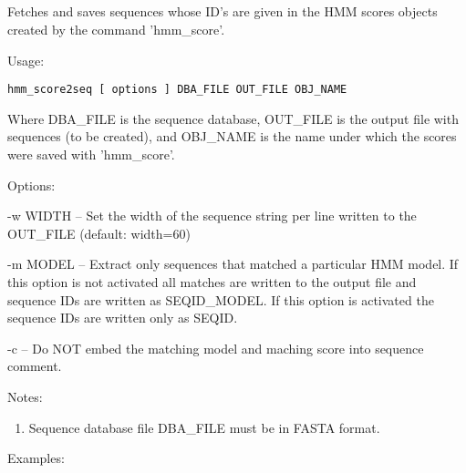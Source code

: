 

\subsection[hmm\_score2seq]{  }



Fetches and saves sequences whose ID's are given in the HMM scores
objects created by the command 'hmm\_score'.


\begin{description}


\item{Usage:}

{\tt hmm\_score2seq [ options ] DBA\_FILE OUT\_FILE OBJ\_NAME}

Where DBA\_FILE is the sequence database, OUT\_FILE is the output file
with sequences (to be created), and OBJ\_NAME is the name under which
the scores were saved with 'hmm\_score'.


\item{Options:}
\begin{description}
\item -w WIDTH -- Set the width of the sequence string per line written
to the OUT\_FILE (default: width=60)
\item -m MODEL -- Extract only sequences that matched a particular HMM
model. If this option is not activated all matches are written to
the output file and sequence IDs are written as SEQID\@PFAM\_MODEL.
If this option is activated the sequence IDs are written only as
SEQID.
\item -c -- Do NOT embed the matching model and maching score into sequence
comment.
\end{description}


\item{Notes:}
\begin{enumerate}
\item Sequence database file DBA\_FILE must be in FASTA format.
\end{enumerate}


\item{Examples:}
\begin{enumerate}


\end{enumerate}
\end{description}
